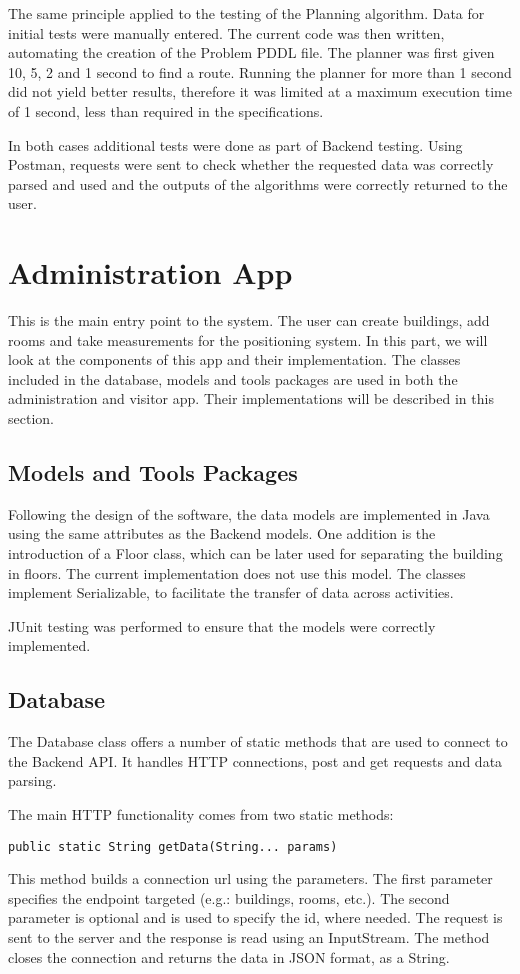 The same principle applied to the testing of the Planning algorithm. Data for initial tests were manually entered. The current code was then written, automating the creation of the Problem PDDL file. The planner was first given 10, 5, 2 and 1 second to find a route. Running the planner for more than 1 second did not yield better results, therefore it was limited at a maximum execution time of 1 second, less than required in the specifications.

In both cases additional tests were done as part of Backend testing. Using Postman, requests were sent to check whether the requested data was correctly parsed and used and the outputs of the algorithms were correctly returned to the user.

\section{Administration App}
This is the main entry point to the system. The user can create buildings, add rooms and take measurements for the positioning system. In this part, we will look at the components of this app and their implementation. The classes included in the database, models and tools packages are used in both the administration and visitor app. Their implementations will be described in this section.

\subsection{Models and Tools Packages}
Following the design of the software, the data models are implemented in Java using the same attributes as the Backend models. One addition is the introduction of a Floor class, which can be later used for separating the building in floors. The current implementation does not use this model. The classes implement Serializable, to facilitate the transfer of data across activities. 

JUnit testing was performed to ensure that the models were correctly implemented. 
\subsection{Database}
The Database class offers a number of static methods that are used to connect to the Backend API. It handles HTTP connections, post and get requests and data parsing.

\noindent
The main HTTP functionality comes from two static methods:

\begin{lstlisting}
public static String getData(String... params)
\end{lstlisting}
This method builds a connection url using the parameters. The first parameter specifies the endpoint targeted (e.g.: buildings, rooms, etc.). The second parameter is optional and is used to specify the id, where needed. The request is sent to the server and the response is read using an InputStream. The method closes the connection and returns the data in JSON format, as a String.

